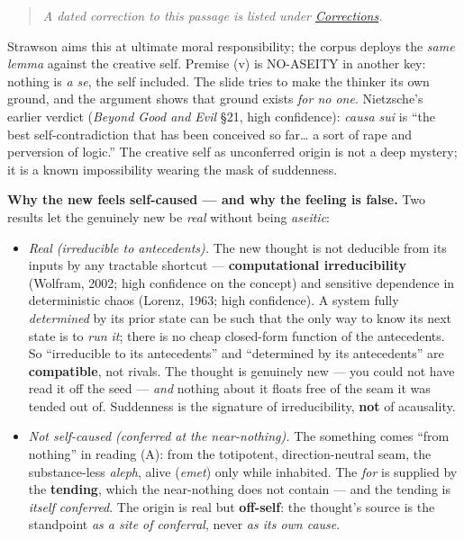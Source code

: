\documentclass[11pt]{article}
\begin{document}
\begin{quote}\small\emph{A dated correction to this passage is listed under \hyperref[corrections]{Corrections}.}\end{quote}

Strawson aims this at ultimate moral responsibility; the corpus deploys the \emph{same lemma} against the creative self. Premise (v) is NO-ASEITY in another key: nothing is \emph{a se}, the self included. The slide tries to make the thinker its own ground, and the argument shows that ground exists \emph{for no one}. Nietzsche's earlier verdict (\emph{Beyond Good and Evil} §21, high confidence): \emph{causa sui} is ``the best self-contradiction that has been conceived so far… a sort of rape and perversion of logic.'' The creative self as unconferred origin is not a deep mystery; it is a known impossibility wearing the mask of suddenness.

\textbf{Why the new feels self-caused — and why the feeling is false.} Two results let the genuinely new be \emph{real} without being \emph{aseitic}:

\begin{itemize}
\item \emph{Real (irreducible to antecedents).} The new thought is not deducible from its inputs by any tractable shortcut — \textbf{computational irreducibility} (Wolfram, 2002; high confidence on the concept) and sensitive dependence in deterministic chaos (Lorenz, 1963; high confidence). A system fully \emph{determined} by its prior state can be such that the only way to know its next state is to \emph{run it}; there is no cheap closed-form function of the antecedents. So ``irreducible to its antecedents'' and ``determined by its antecedents'' are \textbf{compatible}, not rivals. The thought is genuinely new — you could not have read it off the seed — \emph{and} nothing about it floats free of the seam it was tended out of. Suddenness is the signature of irreducibility, \textbf{not} of acausality.
\item \emph{Not self-caused (conferred at the near-nothing).} The something comes ``from nothing'' in reading (A): from the totipotent, direction-neutral seam, the substance-less \emph{aleph}, alive (\emph{emet}) only while inhabited. The \emph{for} is supplied by the \textbf{tending}, which the near-nothing does not contain — and the tending is \emph{itself conferred}. The origin is real but \textbf{off-self}: the thought's source is the standpoint \emph{as a site of conferral}, never \emph{as its own cause}.
\end{itemize}
\end{document}
